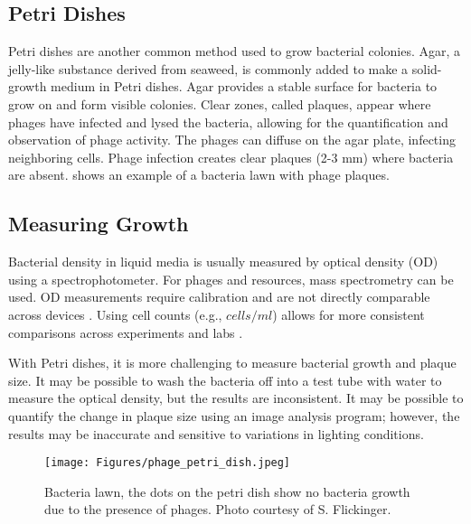 \subsection{Petri Dishes}
Petri dishes are another common method used to grow bacterial colonies. 
Agar, a jelly-like substance derived from seaweed, is commonly added to make a solid-growth medium in Petri dishes. 
Agar provides a stable surface for bacteria to grow on and form visible colonies. 
Clear zones, called plaques, appear where phages have infected and lysed the bacteria, allowing for the quantification and observation of phage activity. 
The phages can diffuse on the agar plate, infecting neighboring cells. 
Phage infection creates clear plaques (2-3 mm) where bacteria are absent. 
 shows an example of a bacteria lawn with phage plaques. 

\subsection{Measuring Growth}
Bacterial density in liquid media is usually measured by optical density (OD) using a spectrophotometer. 
For phages and resources, mass spectrometry can be used. OD measurements require calibration and are not directly comparable across devices \cite{bealRobustEstimationBacterial2020}. 
Using cell counts (e.g., $cells/ml$) allows for more consistent comparisons across experiments and labs \cite{miraEstimatingMicrobialPopulation2022}.

With Petri dishes, it is more challenging to measure bacterial growth and plaque size. 
It may be possible to wash the bacteria off into a test tube with water to measure the optical density, but the results are inconsistent. 
It may be possible to quantify the change in plaque size using an image analysis program; however, the results may be inaccurate and sensitive to variations in lighting conditions. 

\begin{figure}[h!]
    \texttt{[image: Figures/phage\_petri\_dish.jpeg]}
    \centering
    \caption{
        Bacteria lawn, the dots on the petri dish show no bacteria growth due to the presence of phages. 
        Photo courtesy of S. Flickinger. 
    }
    \label{fig:phage_petri_dish}
\end{figure}

